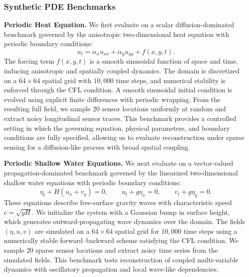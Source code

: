 \subsubsection{Synthetic PDE Benchmarks}
\label{sec:synthetic_datasets}

\noindent\textbf{Periodic Heat Equation.}
We first evaluate on a scalar diffusion-dominated benchmark governed by the anisotropic two-dimensional heat equation with periodic boundary conditions:
\[
u_t = \alpha_x u_{xx} + \alpha_y u_{yy} + f(x,y,t).
\]
The forcing term $f(x,y,t)$ is a smooth sinusoidal function of space and time, inducing anisotropic and spatially coupled dynamics. The domain is discretized on a $64 \times 64$ spatial grid with $10{,}000$ time steps, and numerical stability is enforced through the CFL condition. A smooth sinusoidal initial condition is evolved using explicit finite differences with periodic wrapping. From the resulting full field, we sample 20 sensor locations uniformly at random and extract noisy longitudinal sensor traces. This benchmark provides a controlled setting in which the governing equation, physical parameters, and boundary conditions are fully specified, allowing us to evaluate reconstruction under sparse sensing for a diffusion-like process with broad spatial coupling.

\noindent\textbf{Periodic Shallow Water Equations.}
We next evaluate on a vector-valued propagation-dominated benchmark governed by the linearized two-dimensional shallow water equations with periodic boundary conditions:
\[
\eta_t + H(u_x + v_y) = 0, \qquad 
u_t + g \eta_x = 0, \qquad 
v_t + g \eta_y = 0.
\]
These equations describe free-surface gravity waves with characteristic speed $c=\sqrt{gH}$. We initialize the system with a Gaussian bump in surface height, which generates outward-propagating wave dynamics over the domain. The fields $(\eta,u,v)$ are simulated on a $64 \times 64$ spatial grid for $10{,}000$ time steps using a numerically stable forward--backward scheme satisfying the CFL condition. We sample 20 sparse sensor locations and extract noisy time series from the simulated fields. This benchmark tests reconstruction of coupled multi-variable dynamics with oscillatory propagation and local wave-like dependencies.

